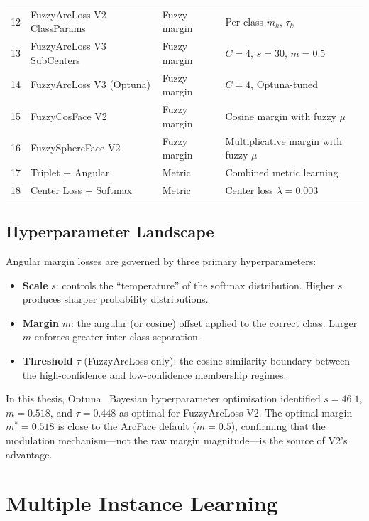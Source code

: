 \begin{table}[ht!]
\begin{tabular}{r l l l}
12 & FuzzyArcLoss V2 ClassParams  & Fuzzy margin   & Per-class $m_k$, $\tau_k$ \\
13 & FuzzyArcLoss V3 SubCenters   & Fuzzy margin   & $C = 4$, $s = 30$, $m = 0.5$ \\
14 & FuzzyArcLoss V3 (Optuna)     & Fuzzy margin   & $C = 4$, Optuna-tuned \\
15 & FuzzyCosFace V2              & Fuzzy margin   & Cosine margin with fuzzy $\mu$ \\
16 & FuzzySphereFace V2           & Fuzzy margin   & Multiplicative margin with fuzzy $\mu$ \\
\hline
17 & Triplet + Angular            & Metric         & Combined metric learning \\
18 & Center Loss + Softmax        & Metric         & Center loss $\lambda = 0.003$ \\
\hline
\end{tabular}
\end{table}


\subsection{Hyperparameter Landscape}
\label{sec:bg:angular:hyperparams}

Angular margin losses are governed by three primary hyperparameters:
\begin{itemize}
    \item \textbf{Scale} $s$: controls the ``temperature'' of the softmax distribution. Higher $s$ produces sharper probability distributions.
    \item \textbf{Margin} $m$: the angular (or cosine) offset applied to the correct class. Larger $m$ enforces greater inter-class separation.
    \item \textbf{Threshold} $\tau$ (FuzzyArcLoss only): the cosine similarity boundary between the high-confidence and low-confidence membership regimes.
\end{itemize}

In this thesis, Optuna~\cite{akiba2019optuna} Bayesian hyperparameter optimisation identified $s = 46.1$, $m = 0.518$, and $\tau = 0.448$ as optimal for FuzzyArcLoss V2.
The optimal margin $m^* = 0.518$ is close to the ArcFace default ($m = 0.5$), confirming that the modulation mechanism---not the raw margin magnitude---is the source of V2's advantage.


\section{Multiple Instance Learning}
\label{sec:bg:mil}

